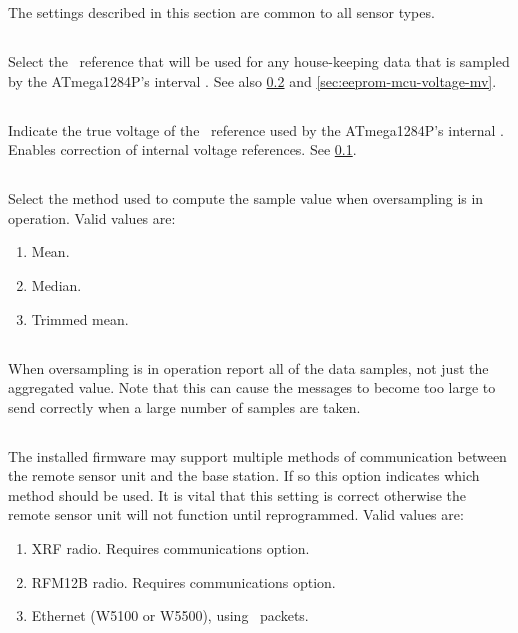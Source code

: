 The settings described in this section are common to all sensor types.

\subsection[adc-ref-type]{}
\label{sec:eeprom-adc-ref-type}

Select the \adc\ reference that will be used for any house-keeping
data that is sampled by the ATmega1284P's interval \adc. See also
\ref{sec:eeprom-adc-ref-voltage-mv} and
\ref{sec:eeprom-mcu-voltage-mv}.

\subsection[adc-ref-voltage-mv]{}
\label{sec:eeprom-adc-ref-voltage-mv}
Indicate the true voltage of the \adc\ reference used by the
ATmega1284P's internal \adc. Enables correction of internal voltage
references. See \ref{sec:eeprom-adc-ref-type}.

\subsection[aggregate]{}
\label{sec:eeprom-aggregate}
Select the method used to compute the sample value when oversampling
is in operation. Valid values are:
\begin{enumerate}
\item[0] Mean.
\item[1] Median.
\item[2] Trimmed mean.
\end{enumerate}

\subsection[all-samples]{}
\label{sec:eeprom-all-samples}
When oversampling is in operation report all of the data samples, not
just the aggregated value. Note that this can cause the messages to
become too large to send correctly when a large number of samples are
taken.

\subsection[comms-type]{}
The installed firmware may support multiple methods of communication
between the remote sensor unit and the base station. If so this option
indicates which method should be used. It is vital that this setting
is correct otherwise the remote sensor unit will not function until
reprogrammed. Valid values are:
\begin{enumerate}
\item[0] XRF radio. Requires  communications option.
\item[1] RFM12B radio. Requires  communications option.
\item[2] Ethernet (W5100 or W5500), using \udp\ packets.
\end{enumerate}

